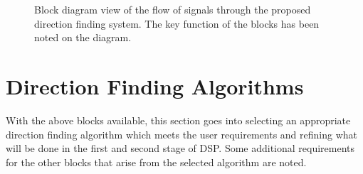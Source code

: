 \begin{landscape}
  \thispagestyle{empty}
  \begin{figure}
    \centering
  \caption{Block diagram view of the flow of signals through the proposed direction finding system. The key function of the blocks has been noted on the diagram. }
  \label{fig:system-design:signal-flow}
  \end{figure}
\end{landscape}

\section{Direction Finding Algorithms}
With the above blocks available, this section goes into selecting an appropriate direction finding algorithm which meets the user requirements and refining what will be done in the first and second stage of DSP. Some additional requirements for the other blocks that arise from the selected algorithm are noted. 

